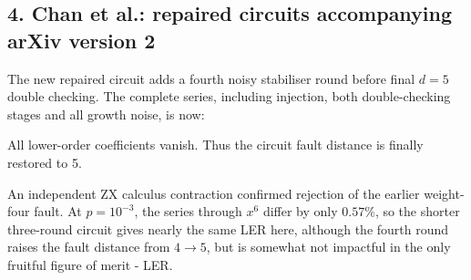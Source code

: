 \subsection*{4. Chan et al.: repaired circuits accompanying arXiv version 2}

The new repaired circuit adds a fourth noisy stabiliser round before final
$d=5$ double checking. The complete series, including injection, both
double-checking stages and all growth noise, is now:

All lower-order coefficients vanish. Thus the circuit fault distance is finally restored to 5.

\begin{center}

\end{center}


An independent ZX calculus contraction confirmed rejection of the earlier weight-four fault.
At $p=10^{-3}$, the series through $x^6$ differ by only $0.57\%$, so the
shorter three-round circuit gives nearly the same LER here, although the
fourth round raises the fault distance from $4 \rightarrow 5$, but is somewhat not impactful in the only fruitful figure of merit - LER.
